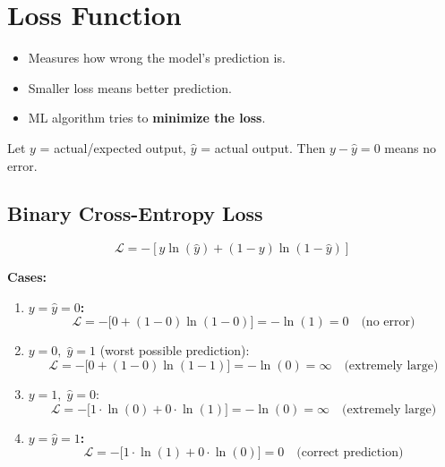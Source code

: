\documentclass[12pt,a4paper]{article}
\begin{document}
\section{Loss Function}

\begin{definitionbox}
\begin{itemize}
  \item Measures how wrong the model's prediction is.
  \item Smaller loss means better prediction.
  \item ML algorithm tries to \textbf{minimize the loss}.
\end{itemize}
\end{definitionbox}

Let $y$ = actual/expected output, $\hat{y}$ = actual output. Then $y - \hat{y} = 0$ means no error.

\subsection{Binary Cross-Entropy Loss}

\[
\boxed{\mathcal{L} = -\left[y\ln(\hat{y}) + (1-y)\ln(1-\hat{y})\right]}
\]

\textbf{Cases:}

\begin{enumerate}
  \item \textbf{$y = \hat{y} = 0$:}
        \[
        \mathcal{L} = -\bigl[0 + (1-0)\ln(1-0)\bigr] = -\ln(1) = 0 \quad \text{(no error)}
        \]

  \item \textbf{$y = 0,\; \hat{y} = 1$} (worst possible prediction):
        \[
        \mathcal{L} = -\bigl[0 + (1-0)\ln(1-1)\bigr] = -\ln(0) = \infty \quad \text{(extremely large)}
        \]

  \item \textbf{$y = 1,\; \hat{y} = 0$}:
        \[
        \mathcal{L} = -\bigl[1 \cdot \ln(0) + 0\cdot \ln(1)\bigr] = -\ln(0) = \infty \quad \text{(extremely large)}
        \]

  \item \textbf{$y = \hat{y} = 1$:}
        \[
        \mathcal{L} = -\bigl[1\cdot \ln(1) + 0\cdot\ln(0)\bigr] = 0 \quad \text{(correct prediction)}
        \]
\end{enumerate}

\end{document}
